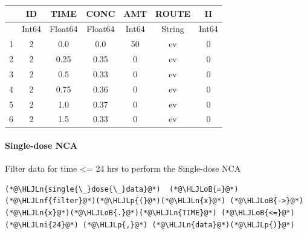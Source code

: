 \documentclass[12pt,a4paper]{article}
\newcommand{\HLJLn}[1]{#1}
\newcommand{\HLJLnf}[1]{\textcolor[RGB]{66,102,213}{#1}}
\newcommand{\HLJLni}[1]{\textcolor[RGB]{59,151,46}{#1}}
\newcommand{\HLJLoB}[1]{\textcolor[RGB]{102,102,102}{\textbf{#1}}}
\newcommand{\HLJLp}[1]{#1}
\begin{document}
\begin{tabular}{r|cccccc}
	& ID & TIME & CONC & AMT & ROUTE & II\\
	\hline
	& Int64 & Float64 & Float64 & Int64 & String & Int64\\
	\hline
	1 & 2 & 0.0 & 0.0 & 50 & ev & 0 \\
	2 & 2 & 0.25 & 0.35 & 0 & ev & 0 \\
	3 & 2 & 0.5 & 0.33 & 0 & ev & 0 \\
	4 & 2 & 0.75 & 0.36 & 0 & ev & 0 \\
	5 & 2 & 1.0 & 0.37 & 0 & ev & 0 \\
	6 & 2 & 1.5 & 0.33 & 0 & ev & 0 \\
\end{tabular}


\paragraph{Single-dose NCA}
Filter data for time <= 24 hrs to perform the Single-dose NCA


\begin{lstlisting}
(*@\HLJLn{single{\_}dose{\_}data}@*)  (*@\HLJLoB{=}@*) (*@\HLJLnf{filter}@*)(*@\HLJLp{(}@*)(*@\HLJLn{x}@*) (*@\HLJLoB{->}@*) (*@\HLJLn{x}@*)(*@\HLJLoB{.}@*)(*@\HLJLn{TIME}@*) (*@\HLJLoB{<=}@*) (*@\HLJLni{24}@*) (*@\HLJLp{,}@*) (*@\HLJLn{data}@*)(*@\HLJLp{)}@*)
\end{lstlisting}
\end{document}
